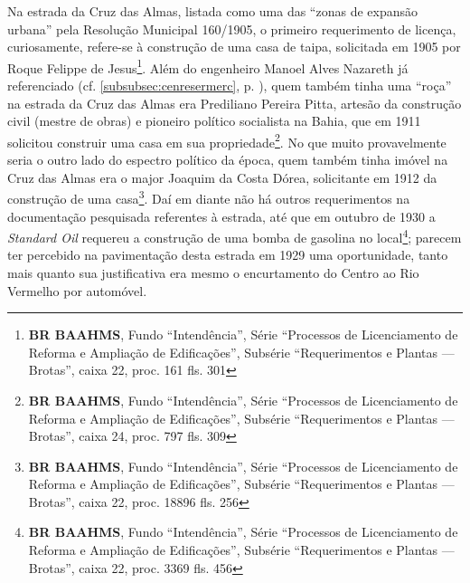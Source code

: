 Na estrada da Cruz das Almas, listada como uma das ``zonas de expansão urbana'' pela Resolução Municipal 160/1905, o primeiro requerimento de licença, curiosamente, refere-se à construção de uma casa de taipa, solicitada em 1905 por Roque Felippe de Jesus\footnote{\textbf{BR BAAHMS}, Fundo ``Intendência'', Série ``Processos de Licenciamento de Reforma e Ampliação de Edificações'', Subsérie ``Requerimentos e Plantas --- Brotas'', caixa 22, proc. 161 fls. 301}. Além do engenheiro Manoel Alves Nazareth já referenciado (cf. \autoref{subsubsec:cenresermerc}, p. \pageref{subsubsec:cenresermerc}), quem também tinha uma ``roça'' na estrada da Cruz das Almas era Prediliano Pereira Pitta, artesão da construção civil (mestre de obras) e pioneiro político socialista na Bahia, que em 1911 solicitou construir uma casa em sua propriedade\footnote{\textbf{BR BAAHMS}, Fundo ``Intendência'', Série ``Processos de Licenciamento de Reforma e Ampliação de Edificações'', Subsérie ``Requerimentos e Plantas --- Brotas'', caixa 24, proc. 797 fls. 309}. No que muito provavelmente seria o outro lado do espectro político da época, quem também tinha imóvel na Cruz das Almas era o major Joaquim da Costa Dórea, solicitante em 1912 da construção de uma casa\footnote{\textbf{BR BAAHMS}, Fundo ``Intendência'', Série ``Processos de Licenciamento de Reforma e Ampliação de Edificações'', Subsérie ``Requerimentos e Plantas --- Brotas'', caixa 22, proc. 18896 fls. 256}. Daí em diante não há outros requerimentos na documentação pesquisada referentes à estrada, até que em outubro de 1930 a \textit{Standard Oil} requereu a construção de uma bomba de gasolina no local\footnote{\textbf{BR BAAHMS}, Fundo ``Intendência'', Série ``Processos de Licenciamento de Reforma e Ampliação de Edificações'', Subsérie ``Requerimentos e Plantas --- Brotas'', caixa 22, proc. 3369 fls. 456}; parecem ter percebido na pavimentação desta estrada em 1929 uma oportunidade, tanto mais quanto sua justificativa era mesmo o encurtamento do Centro ao Rio Vermelho por automóvel.

